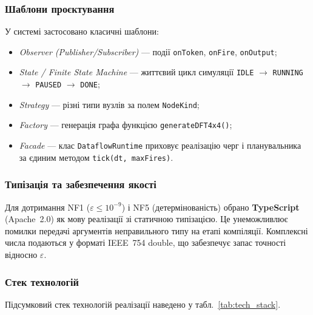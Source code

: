 \documentclass[14pt,a4paper]{extarticle}
\begin{document}
\subsubsection*{Шаблони проєктування}

У системі застосовано класичні шаблони:
\begin{itemize}
  \item \textit{Observer (Publisher/Subscriber)} --- події
        \texttt{onToken}, \texttt{onFire}, \texttt{onOutput};
  \item \textit{State / Finite State Machine} --- життєвий цикл
        симуляції \texttt{IDLE} $\to$ \texttt{RUNNING} $\to$
        \texttt{PAUSED} $\to$ \texttt{DONE};
  \item \textit{Strategy} --- різні типи вузлів за полем
        \texttt{NodeKind};
  \item \textit{Factory} --- генерація графа функцією
        \texttt{generateDFT4x4()};
  \item \textit{Facade} --- клас \texttt{DataflowRuntime} приховує
        реалізацію черг і планувальника за єдиним методом
        \texttt{tick(dt, maxFires)}.
\end{itemize}

\subsubsection*{Типізація та забезпечення якості}

Для дотримання NF1 ($\varepsilon \le 10^{-9}$) і NF5 (детермінованість)
обрано \textbf{TypeScript} (Apache~2.0) як мову реалізації зі
статичною типізацією. Це унеможливлює помилки передачі аргументів
неправильного типу на етапі компіляції. Комплексні числа подаються
у форматі IEEE~754 double, що забезпечує запас точності відносно
$\varepsilon$.

\subsubsection*{Стек технологій}

Підсумковий стек технологій реалізації наведено у
табл.~\ref{tab:tech_stack}.
\end{document}
